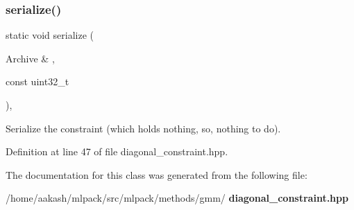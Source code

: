 \subsubsection{serialize()}
{\footnotesize\ttfamily static void serialize (\begin{DoxyParamCaption}\item[{Archive \&}]{,  }\item[{const uint32\+\_\+t}]{ }\end{DoxyParamCaption})\hspace{0.3cm}{\ttfamily [inline]}, {\ttfamily [static]}}



Serialize the constraint (which holds nothing, so, nothing to do). 



Definition at line 47 of file diagonal\+\_\+constraint.\+hpp.



The documentation for this class was generated from the following file\+:\begin{DoxyCompactItemize}
\item 
/home/aakash/mlpack/src/mlpack/methods/gmm/\textbf{ diagonal\+\_\+constraint.\+hpp}\end{DoxyCompactItemize}
